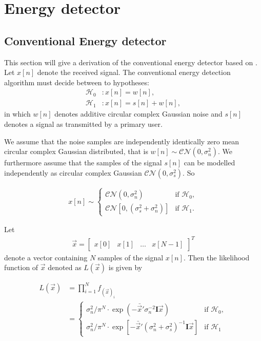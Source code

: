 \documentclass[a4paper, openany, oneside]{memoir}
\begin{document}
\section{Energy detector}

\subsection{Conventional Energy detector}\label{ssec:conv_ed_derivation}
This section will give a derivation of the conventional energy detector based on \cite{atapattu2014energy}.
Let $x[n]$ denote the received signal. The conventional energy detection algorithm must decide between to hypotheses:
\begin{align}\label{eq:hypotheses}
  \mathcal{H}_0&: x[n] = w[n],\\
  \mathcal{H}_1&: x[n] = s[n] + w[n],
\end{align}
in which $w[n]$ denotes additive circular complex Gaussian noise and $s[n]$ denotes a signal as transmitted by a primary user.

We assume that the noise samples are independently identically zero mean circular complex Gaussian distributed, that is $w[n] \sim \mathcal{CN}(0, \sigma_n^2)$. 
We furthermore assume that the samples of the signal $s[n]$ can be modelled independently as circular complex Gaussian $\mathcal{CN}(0, \sigma_s^2)$. %
So

\begin{align*}
x[n] \sim 
    \begin{cases}
        \mathcal{CN}(0, \sigma_n^2) & \text{if $\mathcal{H}_0$}, \\
        \mathcal{CN}[0, (\sigma_s^2 + \sigma_n^2)] & \text{if $\mathcal{H}_1$}.
    \end{cases}
\end{align*} 

Let
\begin{align*}
    \vec{x} = \begin{bmatrix}x[0] & x[1] & \ldots & x[N-1]\end{bmatrix}^T
\end{align*}
denote a vector containing $N$ samples of the signal $x[n]$. Then the likelihood function of $\vec{x}$ denoted as $L(\vec{x})$ is given by

\begin{align*}
    L(\vec{x}) &= \prod_{i=1}^N f_{(\vec{x})_i}\\
    &= \begin{cases}
        \sigma_n^2/\pi^N \cdot \exp(-\bar{\vec{x}}'\sigma_n^{-2}\mathbf{I}\vec{x}) & \text{if $\mathcal{H}_0$}, \\
        \sigma_n^2/\pi^N \cdot \exp[-\bar{\vec{x}}'(\sigma_n^2+\sigma_s^2)^{-1}\mathbf{I}\vec{x}] & \text{if $\mathcal{H}_1$}
    \end{cases}
\end{align*}
\end{document}
